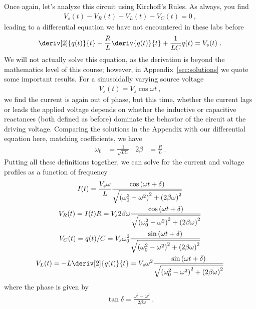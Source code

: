 \documentclass[12pt]{article}
\begin{document}
Once again, let's analyze this circuit using Kirchoff's Rules.  As
always, you find
\begin{gather*}
  V_s(t) - V_R(t) - V_L(t) - V_C(t) = 0\ ,
\end{gather*}
leading to a differential equation we have not encountered in these
labs before
\begin{gather*}
  \deriv[2]{q(t)}{t} + \frac{R}{L} \deriv{q(t)}{t} + \frac{1}{LC} q(t)
  = V_s(t)\ .
\end{gather*}
We will not actually solve this equation, as the derivation is beyond
the mathematics level of this course; however, in
Appendix~\ref{sec:solutions} we quote some important results.  For a
sinusoidally varying source voltage
\begin{gather*}
  V_s(t) = V_s \cos\omega t\ ,
\end{gather*}
we find the current is again out of phase, but this time, whether the
current lags or leads the applied voltage depends on whether the
inductive or capacitive reactances (both defined as before) dominate
the behavior of the circuit at the driving voltage.  Comparing the
solutions in the Appendix with our differential equation here,
matching coefficients, we have
\begin{align*}
  \omega_0 &= \frac{1}{\sqrt{LC}} & 2\beta &= \frac{R}{L}\ .
\end{align*}
Putting all these definitions together, we can solve for the current
and voltage profiles as a function of frequency
\begin{gather*}
  I(t) = \frac{V_s \omega}{L} 
  \frac{\cos\left(\omega t + \delta\right)}
  {\sqrt{\left(\omega_0^2-\omega^2\right)^2 +
      \left(2\beta\omega\right)^2}}\\ 
  V_R(t) = I(t) R = V_s 2\beta\omega 
  \frac{\cos\left(\omega t + \delta\right)}
  {\sqrt{\left(\omega_0^2-\omega^2\right)^2 +
      \left(2\beta\omega\right)^2}}\\
  V_C(t) = q(t)/C = 
  V_s \omega_0^2 \frac{\sin\left(\omega t + \delta\right)}
  {\sqrt{\left(\omega_0^2-\omega^2\right)^2 +
      \left(2\beta\omega\right)^2}}\\ 
  V_L(t) = -L\deriv[2]{q(t)}{t} = 
  V_s \omega^2 \frac{\sin\left(\omega t + \delta\right)}
  {\sqrt{\left(\omega_0^2-\omega^2\right)^2 +
      \left(2\beta\omega\right)^2}}\\ 
\end{gather*}
where the phase is given by 
\begin{gather*}
  \tan \delta = \frac{\omega_0^2-\omega^2}{2\beta\omega}\ .
\end{gather*}
\end{document}

